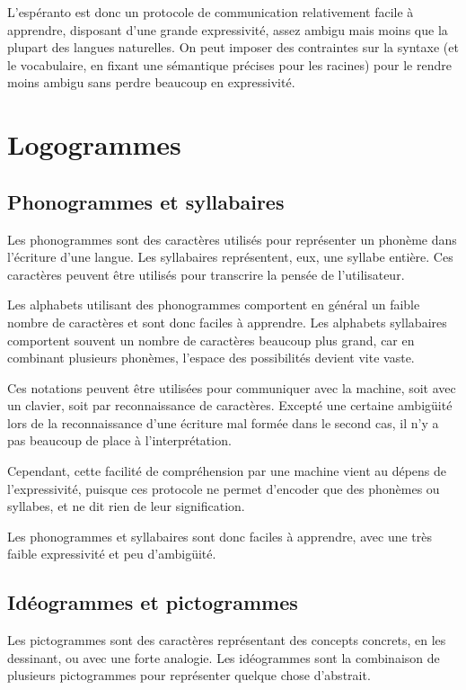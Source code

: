 \documentclass[french,a4paper]{article}
\begin{document}
L'espéranto est donc un protocole de communication relativement facile
à apprendre, disposant d'une grande expressivité, assez ambigu mais
moins que la plupart des langues naturelles. On peut imposer des
contraintes sur la syntaxe (et le vocabulaire, en fixant une
sémantique précises pour les racines) pour le rendre moins ambigu sans
perdre beaucoup en expressivité.

\section{Logogrammes}

\subsection{Phonogrammes et syllabaires}
Les phonogrammes sont des caractères utilisés pour représenter un
phonème dans l'écriture d'une langue. Les syllabaires représentent, eux,
une syllabe entière. Ces caractères peuvent être utilisés pour
transcrire la pensée de l'utilisateur.

Les alphabets utilisant des phonogrammes comportent en général un
faible nombre de caractères et sont donc faciles à apprendre. Les
alphabets syllabaires comportent souvent un nombre de caractères
beaucoup plus grand, car en combinant plusieurs phonèmes, l'espace des
possibilités devient vite vaste.

Ces notations peuvent être utilisées pour communiquer avec la machine,
soit avec un clavier, soit par reconnaissance de caractères. Excepté
une certaine ambigüité lors de la reconnaissance d'une écriture mal
formée dans le second cas, il n'y a pas beaucoup de place à
l'interprétation.

Cependant, cette facilité de compréhension par une machine vient au
dépens de l'expressivité, puisque ces protocole ne permet d'encoder
que des phonèmes ou syllabes, et ne dit rien de leur signification.

Les phonogrammes et syllabaires sont donc faciles à apprendre, avec
une très faible expressivité et peu d'ambigüité.

\subsection{Idéogrammes et pictogrammes}

Les pictogrammes sont des caractères représentant des concepts
concrets, en les dessinant, ou avec une forte analogie. Les
idéogrammes sont la combinaison de plusieurs pictogrammes pour
représenter quelque chose d'abstrait.
\end{document}

